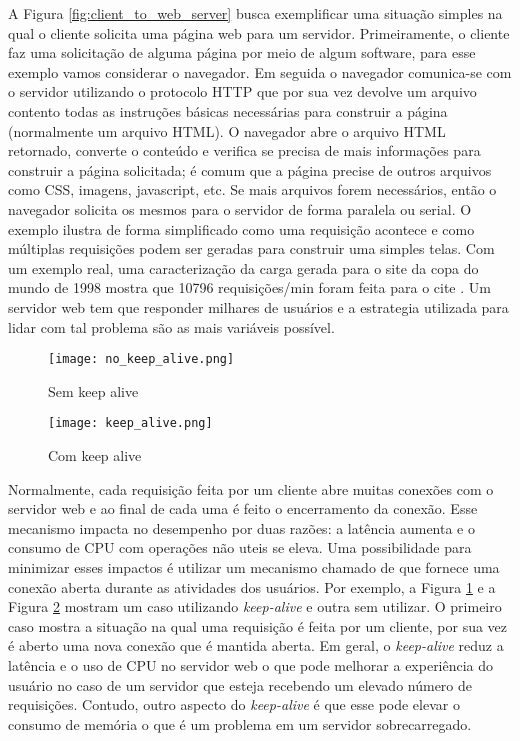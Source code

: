 A Figura \ref{fig:client_to_web_server} busca exemplificar uma situação simples
na qual o cliente solicita uma página web para um servidor. Primeiramente, o
cliente faz uma solicitação de alguma página por meio de algum software, para
esse exemplo vamos considerar o navegador. Em seguida o navegador comunica-se
com o servidor utilizando o protocolo HTTP que por sua vez devolve um arquivo
contento todas as instruções básicas necessárias para construir a página
(normalmente um arquivo HTML). O navegador abre o arquivo HTML retornado,
converte o conteúdo e verifica se precisa de mais informações para construir a
página solicitada; é comum que a página precise de outros arquivos como CSS,
imagens, javascript, etc. Se mais arquivos forem necessários, então o navegador
solicita os mesmos para o servidor de forma paralela ou serial. O exemplo
ilustra de forma simplificado como uma requisição acontece e como múltiplas
requisições podem ser geradas para construir uma simples telas. Com um exemplo
real, uma caracterização da carga gerada para o site da copa do mundo de 1998
mostra que 10796 requisições/min foram feita para o cite \citep{worldcup}. Um
servidor web tem que responder milhares de usuários e a estrategia utilizada
para lidar com tal problema são as mais variáveis possível.

\begin{figure}[!h]
  \centering
  \texttt{[image: no\_keep\_alive.png]}
  \caption{Sem keep alive}
  \label{fig:no_keep_alive}
\end{figure}

\begin{figure}[!h]
  \texttt{[image: keep\_alive.png]}
  \caption{Com keep alive}
  \label{fig:keep_alive}
\end{figure}

Normalmente, cada requisição feita por um cliente abre muitas conexões com o
servidor web e ao final de cada uma é feito o encerramento da conexão. Esse
mecanismo impacta no desempenho por duas razões: a latência aumenta e o consumo
de CPU com operações não uteis se eleva. Uma possibilidade para minimizar esses
impactos é utilizar um mecanismo chamado de  que
fornece uma conexão aberta durante as atividades dos usuários. Por exemplo, a
Figura \ref{fig:no_keep_alive} e a Figura \ref{fig:keep_alive} mostram um caso
utilizando \textit{keep-alive} e outra sem utilizar. O primeiro caso mostra a
situação na qual uma requisição é feita por um cliente, por sua vez é aberto
uma nova conexão que é mantida aberta. Em geral, o \textit{keep-alive} reduz a
latência e o uso de CPU no servidor web o que pode melhorar a experiência do
usuário no caso de um servidor que esteja recebendo um elevado número de
requisições. Contudo, outro aspecto do \textit{keep-alive} é que esse pode
elevar o consumo de memória o que é um problema em um servidor sobrecarregado.

